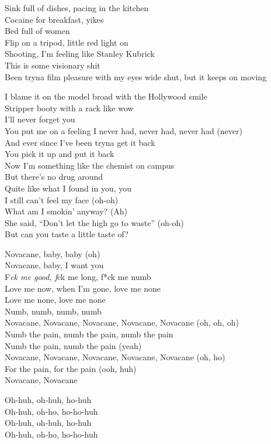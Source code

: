 \documentclass[
  letterpaper,
  DIV=11,
  numbers=noendperiod]{scrreprt}
\begin{document}
Sink full of dishes, pacing in the kitchen\\
Cocaine for breakfast, yikes\\
Bed full of women\\
Flip on a tripod, little red light on\\
Shooting, I'm feeling like Stanley Kubrick\\
This is some visionary shit\\
Been tryna film pleasure with my eyes wide shut, but it keeps on moving

I blame it on the model broad with the Hollywood smile\\
Stripper booty with a rack like wow\\
I'll never forget you\\
You put me on a feeling I never had, never had, never had (never)\\
And ever since I've been tryna get it back\\
You pick it up and put it back\\
Now I'm something like the chemist on campus\\
But there's no drug around\\
Quite like what I found in you, you\\
I still can't feel my face (oh-oh)\\
What am I smokin' anyway? (Ah)\\
She said, ``Don't let the high go to waste'' (oh-oh)\\
But can you taste a little taste of?

Novacane, baby, baby (oh)\\
Novacane, baby, I want you\\
F\emph{ck me good, f}ck me long, f*ck me numb\\
Love me now, when I'm gone, love me none\\
Love me none, love me none\\
Numb, numb, numb, numb\\
Novacane, Novacane, Novacane, Novacane, Novacane (oh, oh, oh)\\
Numb the pain, numb the pain, numb the pain\\
Numb the pain, numb the pain (yeah)\\
Novacane, Novacane, Novacane, Novacane, Novacane (oh, ho)\\
For the pain, for the pain (ooh, huh)\\
Novacane, Novacane

Oh-huh, oh-huh, ho-huh\\
Oh-huh, oh-ho, ho-ho-huh\\
Oh-huh, oh-huh, ho-huh\\
Oh-huh, oh-ho, ho-ho-huh
\end{document}
